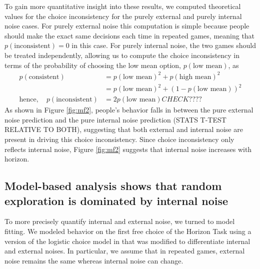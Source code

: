 \documentclass[12pt]{article}
\begin{document}
	To gain more quantitative insight into these results, we computed theoretical values for the choice inconsistency for the purely external and purely internal noise cases.  For purely external noise this computation is simple because people should make the exact same decisions each time in repeated games, meaning that $p(\mbox{inconsistent}) = 0$ in this case. For purely internal noise, the two games should be treated independently, allowing us to compute the choice inconsistency in terms of the probability of choosing the low mean option, $p(\mbox{low mean})$, as
	\begin{equation*}
	\begin{split}
	p(\mbox{consistent}) &= p(\mbox{low mean})^2 + p(\mbox{high mean})^2\\
	&= p(\mbox{low mean})^2 + (1-p(\mbox{low mean}))^2\\ 
	\mbox{hence},\quad p(\mbox{inconsistent}) &=  2 p(\mbox{low mean}) CHECK????
	\end{split}
	\end{equation*}
	As shown in Figure  \ref{fig:mf2}, people's behavior falls in between the pure external noise prediction and the pure internal noise prediction (STATS T-TEST RELATIVE TO BOTH), suggesting that both external and internal noise are present in driving this choice inconsistency. Since choice inconsistency only reflects internal noise, Figure \ref{fig:mf2} suggests that internal noise increases with horizon.
	
	\subsection*{Model-based analysis shows that random exploration is dominated by internal noise}
	
	To more precisely quantify internal and external noise, we turned to model fitting. We modeled behavior on the first free choice of the Horizon Task using a version of the logistic choice model in \citep{wilson2014} that was modified to differentiate internal and external noises. In particular, we assume that in repeated games, external noise remains the same whereas internal noise can change. 
	
\end{document}
